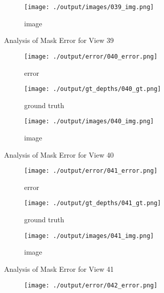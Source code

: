 \documentclass{article}
\begin{document}
\begin{figure}
	\hfill
	\centering
	\begin{subfigure}{0.3\textwidth}
		\centering
		\texttt{[image: ./output/images/039\_img.png]}
		\caption{image}
		\label{fig:img39}
	\end{subfigure}
	\hfill
	\caption{Analysis of Mask Error for View 39}
	\label{fig:error_analys39}
\end{figure}\begin{figure}
	\centering
	\begin{subfigure}{0.3\textwidth}
		\centering
		\texttt{[image: ./output/error/040\_error.png]}
		\caption{error}
		\label{fig:error40}
	\end{subfigure}
	\hfill
	\centering
	\begin{subfigure}{0.3\textwidth}
		\centering
		\texttt{[image: ./output/gt\_depths/040\_gt.png]}
		\caption{ground truth}
		\label{fig:gt40}
	\end{subfigure}
	\hfill
	\centering
	\begin{subfigure}{0.3\textwidth}
		\centering
		\texttt{[image: ./output/images/040\_img.png]}
		\caption{image}
		\label{fig:img40}
	\end{subfigure}
	\hfill
	\caption{Analysis of Mask Error for View 40}
	\label{fig:error_analys40}
\end{figure}\begin{figure}
	\centering
	\begin{subfigure}{0.3\textwidth}
		\centering
		\texttt{[image: ./output/error/041\_error.png]}
		\caption{error}
		\label{fig:error41}
	\end{subfigure}
	\hfill
	\centering
	\begin{subfigure}{0.3\textwidth}
		\centering
		\texttt{[image: ./output/gt\_depths/041\_gt.png]}
		\caption{ground truth}
		\label{fig:gt41}
	\end{subfigure}
	\hfill
	\centering
	\begin{subfigure}{0.3\textwidth}
		\centering
		\texttt{[image: ./output/images/041\_img.png]}
		\caption{image}
		\label{fig:img41}
	\end{subfigure}
	\hfill
	\caption{Analysis of Mask Error for View 41}
	\label{fig:error_analys41}
\end{figure}\begin{figure}
	\centering
	\begin{subfigure}{0.3\textwidth}
		\centering
		\texttt{[image: ./output/error/042\_error.png]}

\end{subfigure}
\end{figure}
\end{document}
